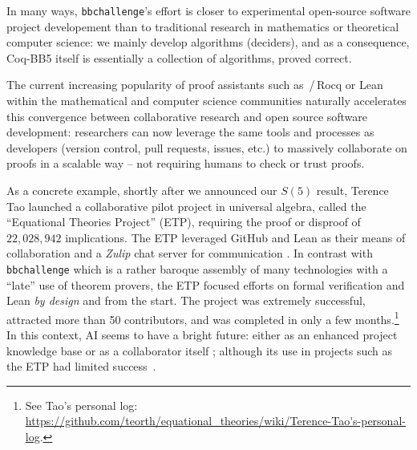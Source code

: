 \documentclass[a4paper,british]{article}
\theoremstyle{definition} %
\numberwithin{equation}{section}
\theoremstyle{definition} %
\newcommand{\CoqBB}{Coq-BB5\xspace}
\begin{document}
In many ways, \texttt{bbchallenge}'s effort is closer to experimental open-source software project developement than to traditional research in mathematics or theoretical computer science: we mainly develop algorithms (deciders), and as a consequence, \CoqBB itself is essentially a collection of algorithms, proved correct.

The current increasing popularity of proof assistants such as \Coq\,/\,Rocq or Lean within the mathematical and computer science communities naturally accelerates this convergence between collaborative research and open source software development: researchers can now leverage the same tools and processes as developers (version control, pull requests, issues, etc.) to massively collaborate on proofs in a scalable way -- \ie not requiring humans to check or trust proofs.

As a concrete example, shortly after we announced our $S(5)$ result, Terence Tao launched a collaborative pilot project in universal algebra, called the ``Equational Theories Project'' (ETP), requiring the proof or disproof of $22,028,942$ implications. The ETP leveraged GitHub and Lean as their means of collaboration and a \textit{Zulip} chat server for communication \cite{TaoBlog, ETPGithub, ETPpaper}. In contrast with \texttt{bbchallenge} which is a rather baroque assembly of many technologies with a ``late'' use of theorem provers, the ETP focused efforts on formal verification and Lean \textit{by design} and from the start. The project was extremely successful, attracted more than 50 contributors, and was completed in only a few months.\footnote{See Tao's personal log: \url{https://github.com/teorth/equational_theories/wiki/Terence-Tao's-personal-log}.} In this context, AI seems to have a bright future: either as an enhanced project knowledge base or as a collaborator itself \cite{Trinh2024, wu2024internlm25stepproveradvancingautomatedtheorem}; although its use in projects such as the ETP had limited success~\cite{ETPpaper}.



\end{document}
